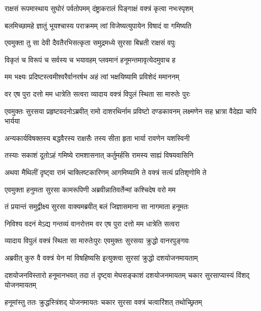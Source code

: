 \twolineshloka
{राक्षसं रूपमास्थाय सुघोरं पर्वतोपमम्}
{दंष्ट्राकरालं पिङ्गाक्षं वक्त्रं कृत्वा नभःस्पृशम्} %

\twolineshloka
{बलमिच्छामहे ज्ञातुं भूयश्चास्य पराक्रमम्}
{त्वां विजेष्यत्युपायेन विषादं वा गमिष्यति} %

\twolineshloka
{एवमुक्ता तु सा देवी दैवतैरभिसत्कृता}
{समुद्रमध्ये सुरसा बिभ्रती राक्षसं वपुः} %

\twolineshloka
{विकृतं च विरूपं च सर्वस्य च भयावहम्}
{प्लवमानं हनूमन्तमावृत्येदमुवाच ह} %

\twolineshloka
{मम भक्ष्यः प्रदिष्टस्त्वमीश्वरैर्वानरर्षभ}
{अहं त्वां भक्षयिष्यामि प्रविशेदं ममाननम्} %

\twolineshloka
{वर एष पुरा दत्तो मम धात्रेति सत्वरा}
{व्यादाय वक्त्रं विपुलं स्थिता सा मारुतेः पुरः} %

\threelineshloka
{एवमुक्तः सुरसया प्रहृष्टवदनोऽब्रवीत्}
{रामो दाशरथिर्नाम प्रविष्टो दण्डकावनम्}
{लक्ष्मणेन सह भ्रात्रा वैदेह्या चापि भार्यया} %

\twolineshloka
{अन्यकार्यविषक्तस्य बद्धवैरस्य राक्षसैः}
{तस्य सीता हृता भार्या रावणेन यशस्विनी} %

\twolineshloka
{तस्याः सकाशं दूतोऽहं गमिष्ये रामशासनात्}
{कर्तुमर्हसि रामस्य साह्यं विषयवासिनि} %

\twolineshloka
{अथवा मैथिलीं दृष्ट्वा रामं चाक्लिष्टकारिणम्}
{आगमिष्यामि ते वक्त्रं सत्यं प्रतिशृणोमि ते} %

\twolineshloka
{एवमुक्ता हनुमता सुरसा कामरूपिणी}
{अब्रवीन्नातिवर्तेन्मां कश्चिदेष वरो मम} %

\twolineshloka
{तं प्रयान्तं समुद्वीक्ष्य सुरसा वाक्यमब्रवीत्}
{बलं जिज्ञासमाना सा नागमाता हनूमतः} %

\twolineshloka
{निविश्य वदनं मेऽद्य गन्तव्यं वानरोत्तम}
{वर एष पुरा दत्तो मम धात्रेति सत्वरा} %

\twolineshloka
{व्यादाय विपुलं वक्त्रं स्थिता सा मारुतेःपुरः}
{एवमुक्तः सुरसया क्रुद्धो वानरपुङ्गवः} %

\twolineshloka
{अब्रवीत् कुरु वै वक्त्रं येन मां विषहिष्यसि}
{इत्युक्त्वा सुरसां क्रुद्धो दशयोजनमायताम्} %

\threelineshloka
{दशयोजनविस्तारो हनूमानभवत् तदा}
{तं दृष्ट्वा मेघसङ्काशं दशयोजनमायतम्}
{चकार सुरसाप्यास्यं विंशद् योजनमायतम्} %

\twolineshloka
{हनूमांस्तु ततः क्रुद्धस्त्रिंशद् योजनमायतः}
{चकार सुरसा वक्त्रं चत्वारिंशत् तथोच्छ्रितम्} %

